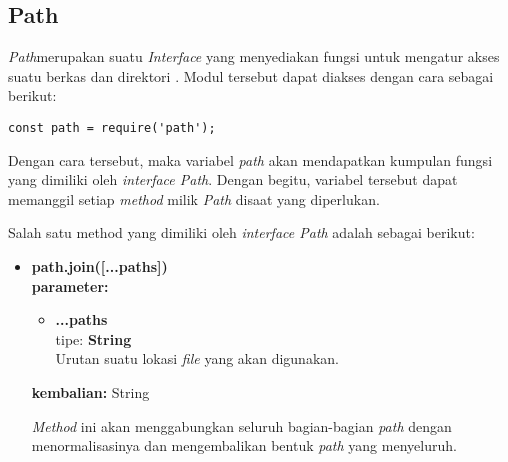 \begin{itemize}
\end{itemize}

\subsection{Path}
\textit{Path}merupakan suatu \textit{Interface} yang menyediakan fungsi untuk mengatur akses suatu berkas dan direktori \cite{dahl:09:nodejsdocs}. Modul tersebut dapat diakses dengan cara sebagai berikut:

\begin{lstlisting}
const path = require('path');
\end{lstlisting}

Dengan cara tersebut, maka variabel \textit{path} akan mendapatkan kumpulan fungsi yang dimiliki oleh \textit{interface Path}. Dengan begitu, variabel tersebut dapat memanggil setiap \textit{method} milik \textit{Path} disaat yang diperlukan. 

Salah satu method yang dimiliki oleh \textit{interface Path} adalah sebagai berikut: 

\begin{itemize}
	\item \textbf{path.join([...paths])} \\ 
	\textbf{parameter:} 
	\begin{itemize}
		\item \textbf{...paths} \\ tipe: \textbf{String} \\ Urutan suatu lokasi \textit{file} yang akan digunakan.
	\end{itemize}

	\textbf{kembalian:} String
	
	\textit{Method} ini akan menggabungkan seluruh bagian-bagian \textit{path} dengan menormalisasinya dan mengembalikan bentuk \textit{path} yang menyeluruh.
\end{itemize}

